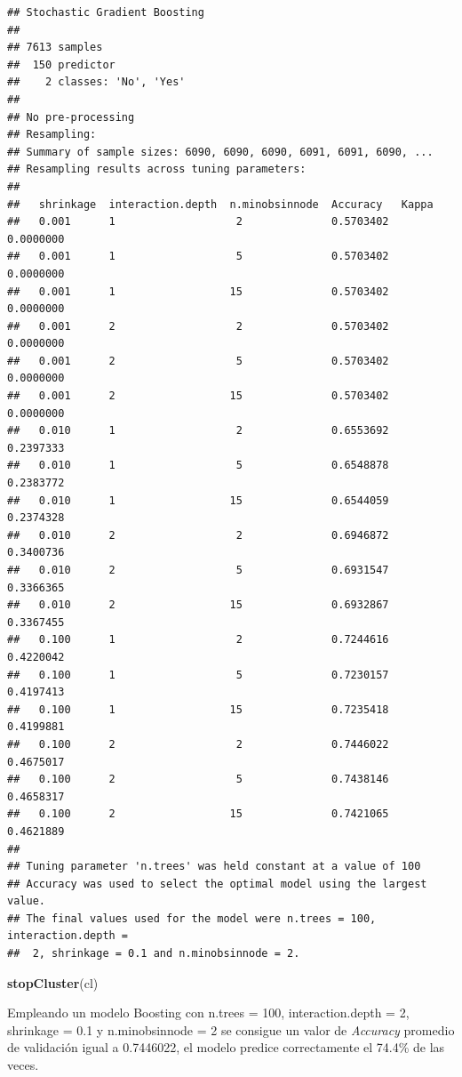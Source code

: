 \documentclass[]{article}
\newenvironment{Shaded}{\begin{snugshade}}{\end{snugshade}}
\newcommand{\KeywordTok}[1]{\textcolor[rgb]{0.13,0.29,0.53}{\textbf{#1}}}
\newcommand{\NormalTok}[1]{#1}
\begin{document}
\begin{verbatim}
## Stochastic Gradient Boosting 
## 
## 7613 samples
##  150 predictor
##    2 classes: 'No', 'Yes' 
## 
## No pre-processing
## Resampling: 
## Summary of sample sizes: 6090, 6090, 6090, 6091, 6091, 6090, ... 
## Resampling results across tuning parameters:
## 
##   shrinkage  interaction.depth  n.minobsinnode  Accuracy   Kappa    
##   0.001      1                   2              0.5703402  0.0000000
##   0.001      1                   5              0.5703402  0.0000000
##   0.001      1                  15              0.5703402  0.0000000
##   0.001      2                   2              0.5703402  0.0000000
##   0.001      2                   5              0.5703402  0.0000000
##   0.001      2                  15              0.5703402  0.0000000
##   0.010      1                   2              0.6553692  0.2397333
##   0.010      1                   5              0.6548878  0.2383772
##   0.010      1                  15              0.6544059  0.2374328
##   0.010      2                   2              0.6946872  0.3400736
##   0.010      2                   5              0.6931547  0.3366365
##   0.010      2                  15              0.6932867  0.3367455
##   0.100      1                   2              0.7244616  0.4220042
##   0.100      1                   5              0.7230157  0.4197413
##   0.100      1                  15              0.7235418  0.4199881
##   0.100      2                   2              0.7446022  0.4675017
##   0.100      2                   5              0.7438146  0.4658317
##   0.100      2                  15              0.7421065  0.4621889
## 
## Tuning parameter 'n.trees' was held constant at a value of 100
## Accuracy was used to select the optimal model using the largest value.
## The final values used for the model were n.trees = 100, interaction.depth =
##  2, shrinkage = 0.1 and n.minobsinnode = 2.
\end{verbatim}

\begin{Shaded}
\begin{Highlighting}[]
\KeywordTok{stopCluster}\NormalTok{(cl)}
\end{Highlighting}
\end{Shaded}

Empleando un modelo Boosting con n.trees = 100, interaction.depth = 2,
shrinkage = 0.1 y n.minobsinnode = 2 se consigue un valor de \emph{Accuracy}
promedio de validación igual a 0.7446022, el modelo predice
correctamente el 74.4\% de las veces.
\end{document}

